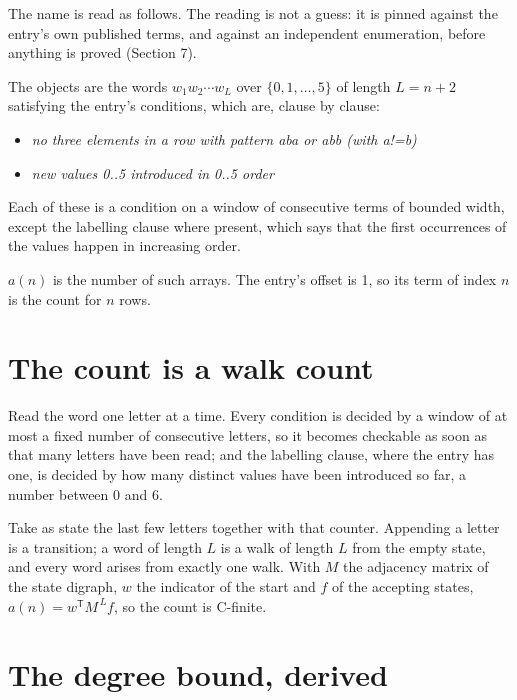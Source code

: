 \documentclass[11pt]{article}
\theoremstyle{definition}
\begin{document}
The name is read as follows. The reading is not a guess: it is pinned against the entry's own published terms, and against an independent enumeration, before anything is proved (Section 7).

The objects are the words $w_1 w_2 \cdots w_L$ over $\{0,1,\dots,5\}$ of length $L = n + 2$ satisfying the entry's conditions, which are, clause by clause:

\begin{itemize}

\item {\itshape no three elements in a row with pattern aba or abb (with a!=b)}

\item {\itshape new values 0..5 introduced in 0..5 order}

\end{itemize}

Each of these is a condition on a window of consecutive terms of bounded width, except the labelling clause where present, which says that the first occurrences of the values happen in increasing order.

$a(n)$ is the number of such arrays. The entry's offset is 1, so its term of index $n$ is the count for $n$ rows.

\section{The count is a walk count}

Read the word one letter at a time. Every condition is decided by a window of at most a fixed number of consecutive letters, so it becomes checkable as soon as that many letters have been read; and the labelling clause, where the entry has one, is decided by how many distinct values have been introduced so far, a number between $0$ and 6.

Take as state the last few letters together with that counter. Appending a letter is a transition; a word of length $L$ is a walk of length $L$ from the empty state, and every word arises from exactly one walk. With $M$ the adjacency matrix of the state digraph, $w$ the indicator of the start and $f$ of the accepting states, $a(n) = w^{\mathsf T}M^{\,L}f$, so the count is C-finite.

\section{The degree bound, derived}
\end{document}
